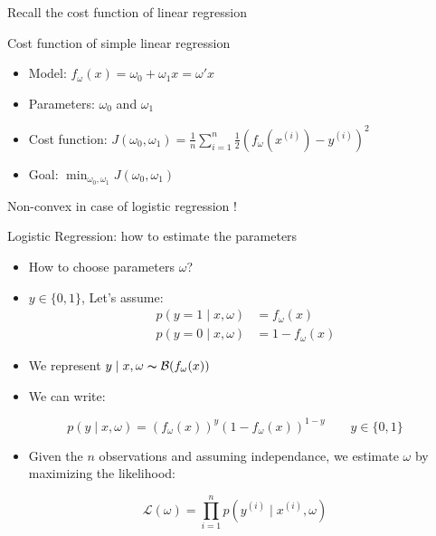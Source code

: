 \documentclass[
  9pt,
  ignorenonframetext,
  aspectratio=169,
  t, dvipsnames]{beamer}
\providecommand{\tightlist}{%
  \setlength{\itemsep}{0pt}\setlength{\parskip}{0pt}}\usepackage{longtable,booktabs,array}
\theoremstyle{definition}
\begin{document}
\begin{frame}{Recall the cost function of linear regression}
\protect\hypertarget{recall-the-cost-function-of-linear-regression}{}
\begin{block}{Cost function of simple linear regression}

\begin{itemize}
\tightlist
\item
  Model: \(f_{\omega}(x) = \omega_0 + \omega_1 x = \omega'x\)
\item
  Parameters: \(\omega_0\) and \(\omega_1\)
\item
  Cost function:
  \(J(\omega_0,\omega_1) = \frac{1}{n} \sum_{i=1}^{n} \frac{1}{2} \left(f_{\omega}\left(x^{(i)}\right)-y^{(i)}\right)^{2}\)
\item
  Goal: \(\min_{\omega_0,\omega_1} J(\omega_0,\omega_1)\)
\end{itemize}

\end{block}

\vspace{1cm}

Non-convex in case of logistic regression \alert{!}
\end{frame}

\begin{frame}{Logistic Regression: how to estimate the parameters}
\protect\hypertarget{logistic-regression-how-to-estimate-the-parameters}{}
\begin{itemize}
\tightlist
\item
  How to choose parameters \(\omega\)?
\item
  \(y \in \{0,1\}\), Let's assume: \begin{align*}
  p(y=1 \mid  x,\omega) &= f_{\omega}(x) \\
  p(y=0 \mid  x,\omega) &= 1- f_{\omega}(x)
  \end{align*}
\end{itemize}

\pause

\begin{itemize}
\tightlist
\item
  We represent \(y\mid x,\omega \thicksim \mathcal{B}(f_{\omega}(x))\)
\item
  We can write:
\end{itemize}

\[p(y \mid  x , \omega)=\left(f_{\omega}(x)\right)^{y}\left(1-f_{\omega}(x)\right)^{1-y} \quad \quad y \in \{0,1\}\]

\pause

\begin{itemize}
\tightlist
\item
  Given the \(n\) observations and assuming independance, we estimate
  \(\omega\) by maximizing the \alert{likelihood}:
\end{itemize}

\[\mathcal{L}(\omega) = \prod_{i=1}^{n} p\left(y^{(i)} \mid x^{(i)} , \omega\right)\]
\end{frame}
\end{document}
